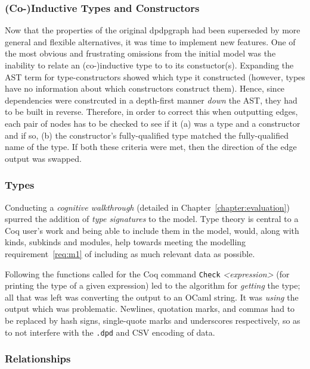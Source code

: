 \subsubsection{(Co-)Inductive Types and Constructors}

Now that the properties of the original dpdpgraph had been superseded by more
general and flexible alternatives, it was time to implement new features.  One
of the most obvious and frustrating omissions from the initial model was the
inability to relate an (co-)inductive type to to its constuctor(s). Expanding the
AST term for type-constructors showed which type it constructed (however, types
have no information about which constructors construct them). Hence, since
dependencies were constrcuted in a depth-first manner \emph{down} the AST, they
had to be built in reverse. Therefore, in order to correct this when outputting
edges, each pair of nodes has to be checked to see if it (a) was a type and a
constructor and if so, (b) the constructor's fully-qualified type matched the
fully-qualified name of the type. If both these criteria were met, then the
direction of the edge output was swapped.

\subsubsection{Types}

Conducting a \emph{cognitive walkthrough} (detailed in
Chapter~\ref{chapter:evaluation}) spurred the addition of \emph{type
signatures} to the model. Type theory is central to a Coq user's work and being
able to include them in the model, would, along with kinds, subkinds and
modules, help towards meeting the modelling requirement~\ref{req:m1} of
including as much relevant data as possible. 

Following the functions called for the Coq command \texttt{Check}
\emph{<expression>} (for printing the type of a given expression) led to the
algorithm for \emph{getting} the type; all that was left was converting the
output to an OCaml string. It was \emph{using} the output which was problematic.
Newlines, quotation marks, and commas had to be replaced by hash signs,
single-quote marks and underscores respectively, so as to not interfere with the
\texttt{.dpd} and CSV encoding of data.

\subsubsection{Relationships}

